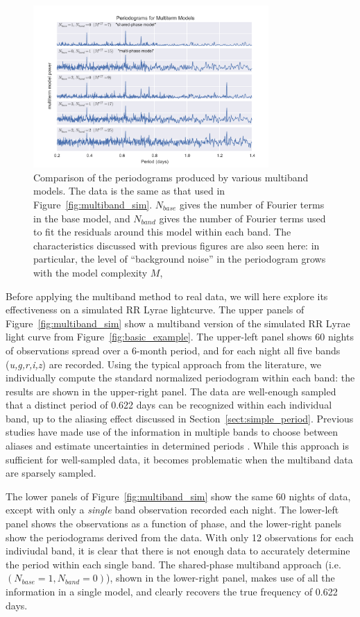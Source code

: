 \documentclass[12pt,preprint]{aastex}
\newcommand{\Fig}[1]{Figure~\ref{fig:#1}}
\newcommand{\fig}[1]{\Fig{#1}}
\newcommand{\figlabel}[1]{\label{fig:#1}}
\newcommand{\Sect}[1]{Section~\ref{sect:#1}}
\newcommand{\sect}[1]{\Sect{#1}}
\begin{document}
\begin{figure}
  \centering
  \includegraphics[width=0.8\textwidth]{fig06.pdf}
  \caption{
    Comparison of the periodograms produced by various multiband models.
    The data is the same as that used in \fig{multiband_sim}. $N_{base}$ gives
    the number of Fourier terms in the base model, and $N_{band}$ gives the
    number of Fourier terms used to fit the residuals around this model within
    each band. The characteristics discussed with previous figures are also
    seen here: in particular, the level of ``background noise'' in the
    periodogram grows with the model complexity $M$,
  } 
  \figlabel{multiband_models}
\end{figure}

Before applying the multiband method to real data, we will here explore its effectiveness on a simulated RR Lyrae lightcurve.
The upper panels of \fig{multiband_sim} show a multiband version of the simulated RR Lyrae light curve from \fig{basic_example}.
The upper-left panel shows 60 nights of observations spread over a 6-month period, and for each night all five bands ({\it u,g,r,i,z}) are recorded.
Using the typical approach from the literature, we individually compute the standard normalized periodogram within each band: the results are shown in the upper-right panel.
The data are well-enough sampled that a distinct period of 0.622 days can be recognized within each individual band, up to the aliasing effect discussed in \sect{simple_period}.
Previous studies have made use of the information in multiple bands to choose between aliases and estimate uncertainties in determined periods \citep[e.g.][]{Oluseyi12,Sesar2010}.
While this approach is sufficient for well-sampled data, it becomes problematic when the multiband data are sparsely sampled.

The lower panels of \fig{multiband_sim} show the same 60 nights of data, except with only a {\it single} band observation recorded each night. The lower-left panel shows the observations as a function of phase, and the lower-right panels show the periodograms derived from the data. With only 12 observations for each indiviudal band, it is clear that there is not enough data to accurately determine the period within each single band. The shared-phase multiband approach (i.e. $(N_{base}=1,N_{band}=0)$), shown in the lower-right panel, makes use of all the information in a single model, and clearly recovers the true frequency of 0.622 days.
\end{document}
